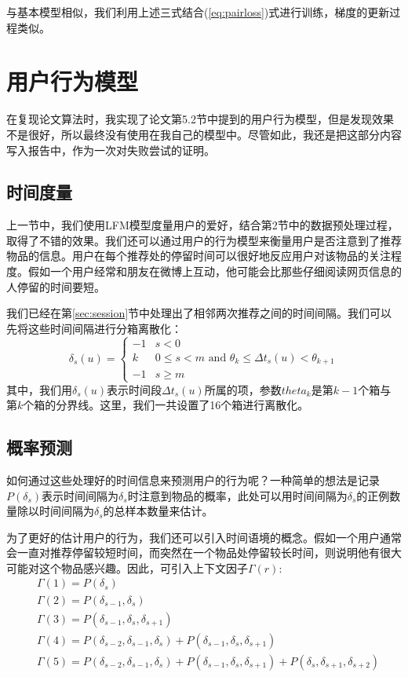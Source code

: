 \documentclass[12pt]{article} %
\begin{document}
\begin{sloppypar}
与基本模型相似，我们利用上述三式结合(\ref{eq:pairloss})式进行训练，梯度的更新过程类似。


\section{用户行为模型}

在复现论文算法时，我实现了论文第5.2节中提到的用户行为模型，但是发现效果不是很好，所以最终没有使用在我自己的模型中。尽管如此，我还是把这部分内容写入报告中，作为一次对失败尝试的证明。

\subsection{时间度量}

上一节中，我们使用LFM模型度量用户的爱好，结合第2节中的数据预处理过程，取得了不错的效果。我们还可以通过用户的行为模型来衡量用户是否注意到了推荐物品的信息。用户在每个推荐处的停留时间可以很好地反应用户对该物品的关注程度。假如一个用户经常和朋友在微博上互动，他可能会比那些仔细阅读网页信息的人停留的时间要短。

我们已经在第\ref{sec:session}节中处理出了相邻两次推荐之间的时间间隔。我们可以先将这些时间间隔进行分箱离散化：
\begin{equation}
\delta_s(u) =
\begin{cases}
-1 & s<0 \\
k & 0\le s < m \text{ and } \theta_k \le \Delta t_s(u) < \theta_{k+1} \\
-1 & s\ge m
\end{cases}
\end{equation}
其中，我们用$\delta_s(u)$表示时间段$\Delta t_s(u)$所属的项，参数$theta_k$是第$k-1$个箱与第$k$个箱的分界线。这里，我们一共设置了16个箱进行离散化。

\subsection{概率预测}

如何通过这些处理好的时间信息来预测用户的行为呢？一种简单的想法是记录$P(\delta_s)$表示时间间隔为$\delta_s$时注意到物品的概率，此处可以用时间间隔为$\delta_s$的正例数量除以时间间隔为$\delta_s$的总样本数量来估计。

为了更好的估计用户的行为，我们还可以引入时间语境的概念。假如一个用户通常会一直对推荐停留较短时间，而突然在一个物品处停留较长时间，则说明他有很大可能对这个物品感兴趣。因此，可引入上下文因子$\Gamma(r)$:
\begin{align}
&\Gamma(1) = P(\delta_s) \\
&\Gamma(2) = P(\delta_{s-1},\delta_s) \\
&\Gamma(3) = P(\delta_{s-1},\delta_s,\delta_{s+1}) \\
&\Gamma(4) = P(\delta_{s-2},\delta_{s-1},\delta_s) + P(\delta_{s-1},\delta_s,\delta_{s+1}) \\
&\Gamma(5) = P(\delta_{s-2},\delta_{s-1},\delta_s) + P(\delta_{s-1},\delta_s,\delta_{s+1}) + P(\delta_s,\delta_{s+1},\delta_{s+2})
\end{align}


\end{sloppypar}
\end{document}
